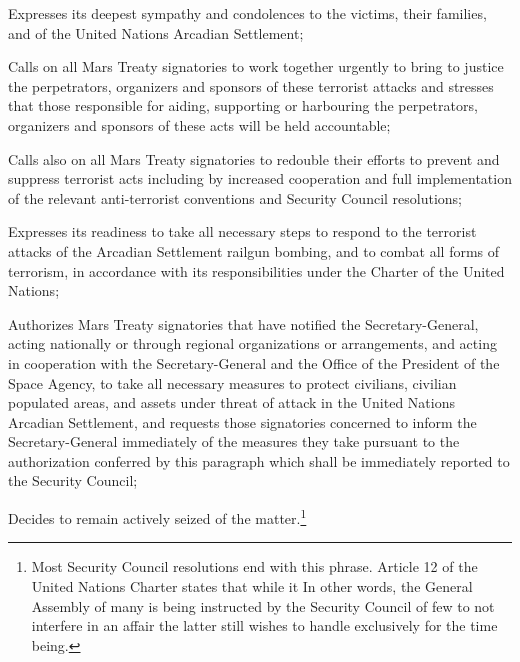 \item Expresses its deepest sympathy and condolences to the victims, their families, and of the United Nations Arcadian Settlement;

\item Calls on all Mars Treaty signatories to work together urgently to bring to justice the perpetrators, organizers and sponsors of these terrorist attacks and stresses that those responsible for aiding, supporting or harbouring the perpetrators, organizers and sponsors of these acts will be held accountable;

\item Calls also on all Mars Treaty signatories to redouble their efforts to prevent and suppress terrorist acts including by increased cooperation and full implementation of the relevant anti-terrorist conventions and Security Council resolutions;

\item Expresses its readiness to take all necessary steps to respond to the terrorist attacks of the Arcadian Settlement railgun bombing, and to combat all forms of terrorism, in accordance with its responsibilities under the Charter of the United Nations;

\item Authorizes Mars Treaty signatories that have notified the Secretary-General, acting nationally or through regional organizations or arrangements, and acting in cooperation with the Secretary-General and the Office of the President of the Space Agency, to take all necessary measures to protect civilians, civilian populated areas, and assets under threat of attack in the United Nations Arcadian Settlement, and requests those signatories concerned to inform the Secretary-General immediately of the measures they take pursuant to the authorization conferred by this paragraph which shall be immediately reported to the Security Council;

\item Decides to remain actively seized of the matter.\footnote{Most Security Council resolutions end with this phrase. Article 12 of the United Nations Charter states that while it  In other words, the General Assembly of many is being instructed by the Security Council of few to not interfere in an affair the latter still wishes to handle exclusively for the time being.}
\stopitemize
\stopTimelineGeneralDocument

